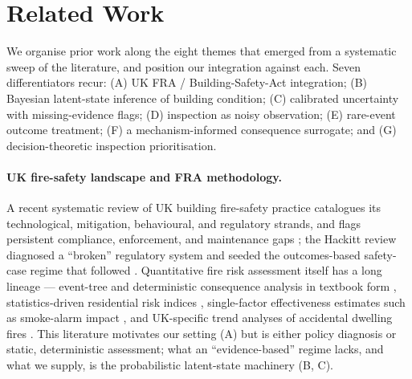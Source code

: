 \section{Related Work}
\label{sec:related}

We organise prior work along the eight themes that emerged from a systematic
sweep of the literature, and position our integration against each. Seven
differentiators recur: (A) UK FRA / Building-Safety-Act integration; (B)
Bayesian latent-state inference of building condition; (C) calibrated
uncertainty with missing-evidence flags; (D) inspection as noisy observation;
(E) rare-event outcome treatment; (F) a mechanism-informed consequence
surrogate; and (G) decision-theoretic inspection prioritisation.

\paragraph{UK fire-safety landscape and FRA methodology.}
A recent systematic review of UK building fire-safety practice catalogues its
technological, mitigation, behavioural, and regulatory strands, and flags
persistent compliance, enforcement, and maintenance gaps \citep{dauda2025uk};
the Hackitt review diagnosed a ``broken'' regulatory system and seeded the
outcomes-based safety-case regime that followed \citep{hackitt2018,perry2025}.
Quantitative fire risk assessment itself has a long lineage --- event-tree and
deterministic consequence analysis in textbook form \citep{yung2008,rasbash2004},
statistics-driven residential risk indices \citep{xin2013}, single-factor
effectiveness estimates such as smoke-alarm impact \citep{gilbert2021}, and
UK-specific trend analyses of accidental dwelling fires \citep{taylor2026}.
This literature motivates our setting (A) but is either policy diagnosis or
static, deterministic assessment; what an ``evidence-based'' regime lacks, and
what we supply, is the probabilistic latent-state machinery (B, C).

